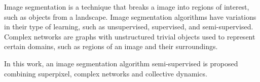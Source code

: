 Image segmentation is a technique that breaks a image into regions of
interest, such as objects from a landscape. Image segmentation
algorithms have variations in their type of learning, such as
unsupervised, supervised, and semi-supervised. Complex networks are
graphs with unstructured trivial objects used to represent certain
domains, such as regions of an image and their surroundings.

In this work, an image segmentation algorithm
semi-supervised is proposed combining superpixel,
complex networks and collective dynamics.

